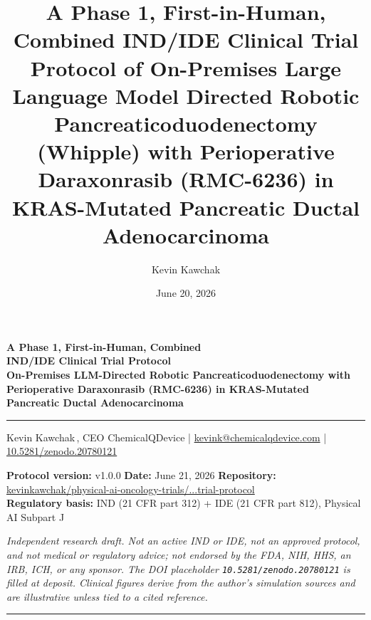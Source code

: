\documentclass[11pt]{article}
\title{A Phase 1, First-in-Human, Combined IND/IDE Clinical Trial Protocol of
On-Premises Large Language Model Directed Robotic Pancreaticoduodenectomy
(Whipple) with Perioperative Daraxonrasib (RMC-6236) in KRAS-Mutated Pancreatic
Ductal Adenocarcinoma}
\author{Kevin Kawchak}
\date{June 20, 2026}
\begin{document}
\thispagestyle{plain}

\begin{center}
{\LARGE\bfseries\color{accentcol} A Phase 1, First-in-Human, Combined\\IND/IDE Clinical Trial Protocol}\\[0.4em]
{\large\bfseries On-Premises LLM-Directed Robotic Pancreaticoduodenectomy with Perioperative Daraxonrasib (RMC-6236) in KRAS-Mutated Pancreatic
Ductal Adenocarcinoma}\\[0.3em]
{\color{accentcol}\rule{\linewidth}{1.2pt}}
\end{center}

\begin{center}\small
Kevin Kawchak\,, CEO ChemicalQDevice \;|\;
\href{mailto:kevink@chemicalqdevice.com}{kevink@chemicalqdevice.com} \;|\;
\href{https://doi.org/10.5281/zenodo.20780121}{10.5281/zenodo.20780121}
\end{center}

\begin{center}\footnotesize
\textbf{Protocol version:} v1.0.0 \quad  
\textbf{Date:} June 21, 2026 \quad \textbf{Repository:} \href{https://github.com/kevinkawchak/physical-ai-oncology-trials/tree/main/trial-protocol}{kevinkawchak/physical-ai-oncology-trials/...trial-protocol} \\
\textbf{Regulatory basis:} IND (21 CFR part 312) + IDE (21 CFR part 812),
Physical AI Subpart J
\end{center}

\noindent\footnotesize\textit{Independent research draft. Not an active IND or
IDE, not an approved protocol, and not medical or regulatory advice; not endorsed
by the FDA, NIH, HHS, an IRB, ICH, or any sponsor. The DOI placeholder
\texttt{10.5281/zenodo.20780121} is filled at deposit. Clinical figures derive
from the author's simulation sources and are illustrative unless tied to a cited
reference.}\normalsize\par

\renewcommand{\keywordname}{\textbf{Keywords}}

\vspace{0.4em}
{\color{accentcol}\rule{\linewidth}{0.6pt}}

\renewcommand{\contentsname}{\color{accentcol}Table of Contents}
{\setlength{\parskip}{0pt}\small\tableofcontents}
\clearpage
\end{document}
